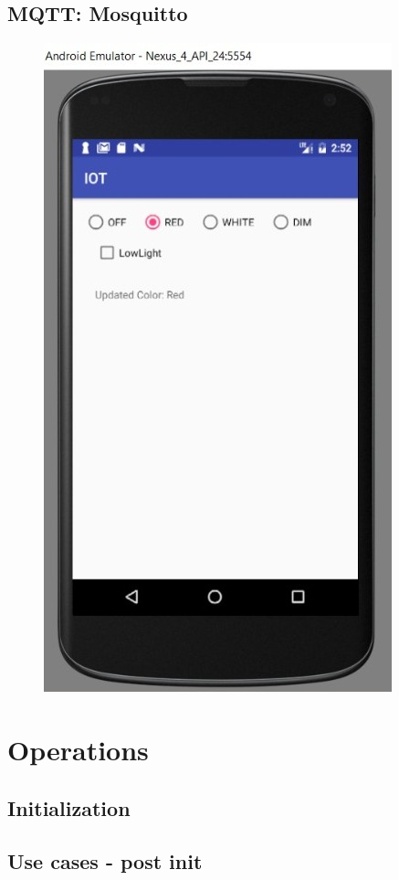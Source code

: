 \documentclass[conference]{IEEEtran}
\begin{document}
\subsection{MQTT: Mosquitto}


\begin{figure}[h]
	\begin{center}
		\includegraphics[width=.7\linewidth]{img/androidapp}
		\caption{}
		\label{fig:fig3}
	\end{center}
\end{figure}


\section{Operations}

\subsection{Initialization}

\subsection{Use cases - post init}
\end{document}
